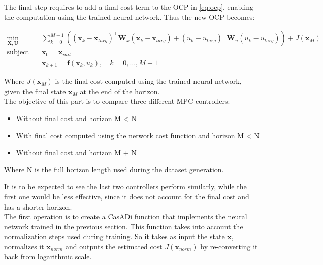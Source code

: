 

The final step requires to add a final cost term to the OCP in \eqref{eq:ocp}, enabling the computation using the trained neural network. Thus the new OCP becomes:

\begin{equation}
\label{eq:ocp_final}
\begin{aligned}
    \min_{\mathbf{X}, \mathbf{U}} \quad & \sum_{k=0}^{M-1} \left( (\mathbf{x}_k - \mathbf{x}_{targ})^\top \mathbf{W}_x (\mathbf{x}_k - \mathbf{x}_{targ}) + (u_k - u_{targ})^\top \mathbf{W}_u (u_k - u_{targ}) \right) + J(\mathbf{x}_M) \\
    \text{subject to} \quad & \mathbf{x}_0 = \mathbf{x}_{init} \\
    & \mathbf{x}_{k+1} = \mathbf{f}(\mathbf{x}_k, u_k), \quad k = 0, \dots, M-1
\end{aligned}
\end{equation}
\vspace{\baselineskip}

\noindent Where \(J(\mathbf{x}_M)\) is the final cost computed using the trained neural network, given the final state \(\mathbf{x}_M\) at the end of the horizon. \\

\noindent The objective of this part is to compare three different MPC controllers:
\begin{itemize}[noitemsep]
    \item Without final cost and horizon M < N
    \item With final cost computed using the network cost function and horizon M < N
    \item Without final cost and horizon M + N
\end{itemize} 

\noindent Where N is the full horizon length used during the dataset generation.

\noindent
It is to be expected to see the last two controllers perform similarly, while the first one would be less effective, since it does not account for the final cost and has a shorter horizon.\\

\noindent The first operation is to create a CasADi function that implements the neural network trained in the previous section. This function takes into account the normalization steps used during training. So it takes as input the state \(\mathbf{x}\), normalizes it  \(\mathbf{x}_{norm}\) and outputs the estimated cost \(J(\mathbf{x}_{norm})\) by re-converting it back from logarithmic scale.

